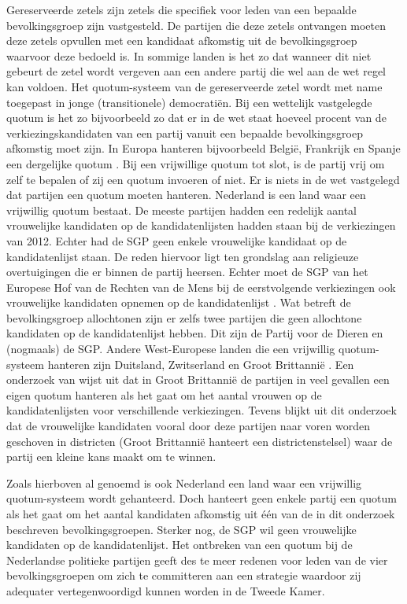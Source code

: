 Gereserveerde zetels zijn zetels die specifiek voor leden van een bepaalde bevolkingsgroep zijn vastgesteld. De partijen die deze zetels ontvangen moeten deze zetels opvullen met een kandidaat afkomstig uit de bevolkingsgroep waarvoor deze bedoeld is. In sommige landen is het zo dat wanneer dit niet gebeurt de zetel wordt vergeven aan een andere partij die wel aan de wet regel kan voldoen. Het quotum-systeem van de gereserveerde zetel wordt met name toegepast in jonge (transitionele) democrati\"{e}n. Bij een wettelijk vastgelegde quotum is het zo bijvoorbeeld zo dat er in de wet staat hoeveel procent van de verkiezingskandidaten van een partij vanuit een bepaalde bevolkingsgroep afkomstig moet zijn. In Europa hanteren bijvoorbeeld Belgi\"{e}, Frankrijk en Spanje een dergelijke quotum
 \citep{council2012positive}. Bij een vrijwillige quotum tot slot, is de partij vrij om zelf te bepalen of zij een quotum invoeren of niet. Er is niets in de wet vastgelegd dat partijen een quotum moeten hanteren. Nederland is een land waar een vrijwillig quotum bestaat. De meeste partijen hadden een redelijk aantal vrouwelijke kandidaten op de kandidatenlijsten hadden staan bij de verkiezingen van 2012. Echter had de SGP geen enkele vrouwelijke kandidaat op de kandidatenlijst staan. De reden hiervoor ligt ten grondslag aan religieuze overtuigingen die er binnen de partij heersen. Echter moet de SGP van het Europese Hof van de Rechten van de Mens bij de eerstvolgende verkiezingen ook vrouwelijke kandidaten opnemen op de kandidatenlijst \citep{Nudef30:online}. Wat betreft de bevolkingsgroep allochtonen zijn er zelfs twee partijen die geen allochtone kandidaten op de kandidatenlijst hebben. Dit zijn de Partij voor de Dieren en (nogmaals) de SGP. Andere West-Europese landen die een vrijwillig quotum-systeem hanteren zijn Duitsland, Zwitserland en Groot Brittannië \citep{Quota47:online}. Een onderzoek van \cite{ryan2010politics} wijst uit dat in Groot Brittannië de partijen in veel gevallen een eigen quotum hanteren als het gaat om het aantal vrouwen op de kandidatenlijsten voor verschillende verkiezingen. Tevens blijkt uit dit onderzoek dat de vrouwelijke kandidaten vooral door deze partijen naar voren worden geschoven in districten (Groot Brittannië hanteert een districtenstelsel) waar de partij een kleine kans maakt om te winnen. 

Zoals hierboven al genoemd is ook Nederland een land waar een vrijwillig quotum-systeem wordt gehanteerd.  Doch hanteert geen enkele partij een quotum als het gaat om het aantal kandidaten afkomstig uit één van de in dit onderzoek beschreven bevolkingsgroepen. Sterker nog, de SGP wil geen vrouwelijke kandidaten op de kandidatenlijst. Het ontbreken van een quotum bij de Nederlandse politieke partijen geeft des te meer redenen voor leden van de vier bevolkingsgroepen om zich te committeren aan een strategie waardoor zij adequater vertegenwoordigd kunnen worden in de Tweede Kamer.

